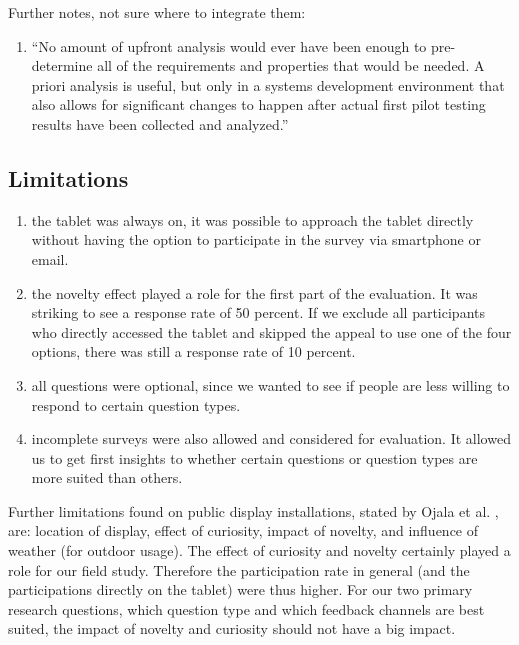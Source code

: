 	Further notes, not sure where to integrate them:
	\begin{enumerate}
	\item ``No amount of upfront analysis would ever have been enough to pre- determine all of the requirements and properties that would be needed. A priori analysis is useful, but only in a systems development environment that also allows for significant changes to happen after actual first pilot testing results have been collected and analyzed.'' \cite{russell2004use}
	\end{enumerate}










\subsection{Limitations}

	\begin{enumerate}
	\item the tablet was always on, it was possible to approach the tablet directly without having the option to participate in the survey via smartphone or email. 
	\item the novelty effect played a role for the first part of the evaluation. It was striking to see a response rate of 50 percent. If we exclude all participants who directly accessed the tablet and skipped the appeal to use one of the four options, there was still a response rate of 10 percent.
	\item all questions were optional, since we wanted to see if people are less willing to respond to certain question types.
	\item incomplete surveys were also allowed and considered for evaluation. It allowed us to get first insights to whether certain questions or question types are more suited than others.
	\end{enumerate}

	Further limitations found on public display installations, stated by Ojala et al. \cite{Ojala2011}, are: location of display, effect of curiosity, impact of novelty, and influence of weather (for outdoor usage). The effect of curiosity and novelty certainly played a role for our field study. Therefore the participation rate in general (and the participations directly on the tablet) were thus higher. For our two primary research questions, which question type and which feedback channels are best suited, the impact of novelty and curiosity should not have a big impact.

